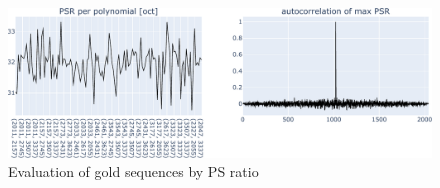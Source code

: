 \begin{figure}[h]
	\centering\includegraphics[width=13.5cm]{images/goldevapsr}
	
	\caption{Evaluation of gold sequences by PS ratio}
	\label{fig:eva}
\end{figure}
